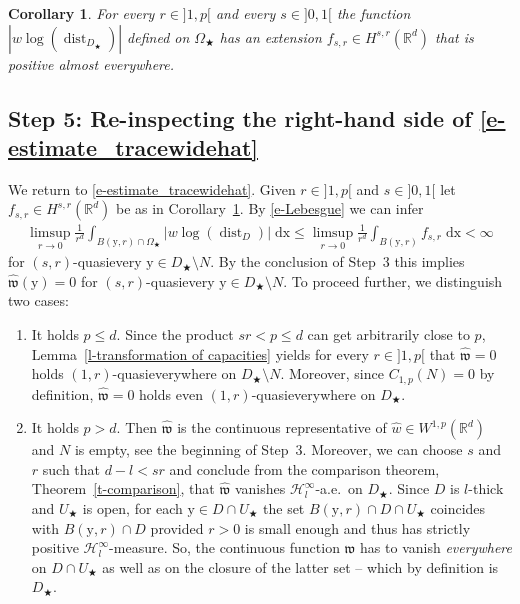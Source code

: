 \documentclass[10pt,leqno]{amsart}
\newtheorem{corollary}[theorem]{Corollary}
\theoremstyle{definition}
\numberwithin{equation}{section}
\begin{document}
\begin{corollary}\label{c-extension wlogdist}
For every $r \in {]1,p[}$ and every $s \in {]0,1[}$ the
function $|w \log({\operatorname{dist}}_{D_\bigstar})|$ defined on $\Omega_\bigstar$
has an extension $f_{s,r} \in H^{s,r}({{\mathbb R}}^d)$ that is positive almost everywhere.
\end{corollary}

\subsection*{Step 5: Re-inspecting the right-hand side of
\eqref{e-estimate_tracewidehat}}

We return to \eqref{e-estimate_tracewidehat}. Given $r \in {]1,p[}$ and $s
\in {]0,1[}$ let $f_{s,r} \in H^{s,r}({{\mathbb R}}^d)$ be as in
Corollary~\ref{c-extension wlogdist}. By \eqref{e-Lebesgue} we can infer
\begin{align*}
 \limsup_{r \to 0} \frac{1}{r^d} \int_{B({{\mathrm y}},r) \cap \Omega_\bigstar} |w
\log({\operatorname{dist}}_D)| \; {{\mathrm d}} {{\mathrm x}}
\leq \limsup_{r \to 0} \frac{1}{r^d} \int_{B({{\mathrm y}},r)} f_{s,r} \; {{\mathrm d}} {{\mathrm x}}
<
\infty
\end{align*}
for $(s,r)$-quasievery ${{\mathrm y}} \in D_\bigstar \setminus N$. By the conclusion of
Step~3 this implies $\widehat{{\mathfrak w}}({{\mathrm y}}) = 0$ for $(s,r)$-quasievery ${{\mathrm y}} \in
D_\bigstar \setminus N$. To proceed further, we distinguish two cases:

\begin{enumerate}
 \item It holds $p \leq d$. Since the product $sr < p\leq d$ can get
 arbitrarily close to $p$, Lemma~\ref{l-transformation of capacities}
 yields for every $r \in {]1,p[}$ that $\widehat{{\mathfrak w}} = 0$ holds
 $(1,r)$-quasieverywhere on $D_\bigstar \setminus N$. Moreover, since
 $C_{1,p}(N) = 0$ by definition, $\widehat{{\mathfrak w}} = 0$ holds even
 $(1,r)$-quasieverywhere on $D_\bigstar$.

 \item It holds $p > d$. Then $\widehat{{\mathfrak w}}$ is the continuous
 representative of $\widehat{w} \in W^{1,p}({{\mathbb R}}^d)$ and $N$ is empty, see the
 beginning of Step~3. Moreover, we can choose $s$ and $r$ such that $d-l < sr$
 and conclude from the comparison theorem, Theorem~\ref{t-comparison}, that
 $\widehat{{\mathfrak w}}$ vanishes ${\mathcal{H}}_l^\infty$-a.e.\ on $D_\bigstar$. Since $D$ is
 $l$-thick and $U_\bigstar$ is open, for each ${{\mathrm y}} \in D \cap U_\bigstar$ the
 set $B({{\mathrm y}},r) \cap D \cap U_\bigstar$ coincides with $B({{\mathrm y}},r) \cap D$ provided
 $r>0$ is small enough and thus has strictly positive ${\mathcal{H}}_l^\infty$-measure.
 So, the continuous function $\widehat{{\mathfrak w}}$ has to vanish \emph{everywhere} on
 $D \cap U_\bigstar$ as well as on the closure of the latter set -- which by
 definition is $D_\bigstar$.
\end{enumerate}
\end{document}
